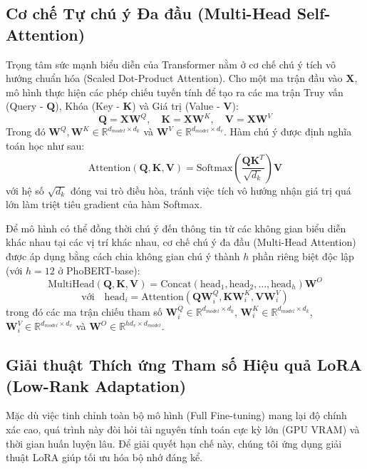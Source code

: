 \subsection{Cơ chế Tự chú ý Đa đầu (Multi-Head Self-Attention)}
Trọng tâm sức mạnh biểu diễn của Transformer nằm ở cơ chế chú ý tích vô hướng chuẩn hóa (Scaled Dot-Product Attention). Cho một ma trận đầu vào $\mathbf{X}$, mô hình thực hiện các phép chiếu tuyến tính để tạo ra các ma trận Truy vấn (Query - $\mathbf{Q}$), Khóa (Key - $\mathbf{K}$) và Giá trị (Value - $\mathbf{V}$):
\begin{equation}
    \mathbf{Q} = \mathbf{X}\mathbf{W}^Q, \quad \mathbf{K} = \mathbf{X}\mathbf{W}^K, \quad \mathbf{V} = \mathbf{X}\mathbf{W}^V
\end{equation}
Trong đó $\mathbf{W}^Q, \mathbf{W}^K \in \mathbb{R}^{d_{model} \times d_k}$ và $\mathbf{W}^V \in \mathbb{R}^{d_{model} \times d_v}$. Hàm chú ý được định nghĩa toán học như sau:
\begin{equation}
    \text{Attention}(\mathbf{Q}, \mathbf{K}, \mathbf{V}) = \text{Softmax}\left(\frac{\mathbf{Q}\mathbf{K}^T}{\sqrt{d_k}}\right)\mathbf{V}
\end{equation}
với hệ số $\sqrt{d_k}$ đóng vai trò điều hòa, tránh việc tích vô hướng nhận giá trị quá lớn làm triệt tiêu gradient của hàm Softmax.

Để mô hình có thể đồng thời chú ý đến thông tin từ các không gian biểu diễn khác nhau tại các vị trí khác nhau, cơ chế chú ý đa đầu (Multi-Head Attention) được áp dụng bằng cách chia không gian chú ý thành $h$ phần riêng biệt độc lập (với $h = 12$ ở PhoBERT-base):
\begin{equation}
    \text{MultiHead}(\mathbf{Q}, \mathbf{K}, \mathbf{V}) = \text{Concat}(\text{head}_1, \text{head}_2, \dots, \text{head}_h)\mathbf{W}^O
\end{equation}
\begin{equation}
    \text{với} \quad \text{head}_i = \text{Attention}(\mathbf{Q}\mathbf{W}_i^Q, \mathbf{K}\mathbf{W}_i^K, \mathbf{V}\mathbf{W}_i^V)
\end{equation}
trong đó các ma trận chiếu tham số $\mathbf{W}_i^Q \in \mathbb{R}^{d_{model} \times d_k}$, $\mathbf{W}_i^K \in \mathbb{R}^{d_{model} \times d_k}$, $\mathbf{W}_i^V \in \mathbb{R}^{d_{model} \times d_v}$ và $\mathbf{W}^O \in \mathbb{R}^{h d_v \times d_{model}}$.

\subsection{Giải thuật Thích ứng Tham số Hiệu quả LoRA (Low-Rank Adaptation)}
Mặc dù việc tinh chỉnh toàn bộ mô hình (Full Fine-tuning) mang lại độ chính xác cao, quá trình này đòi hỏi tài nguyên tính toán cực kỳ lớn (GPU VRAM) và thời gian huấn luyện lâu. Để giải quyết hạn chế này, chúng tôi ứng dụng giải thuật LoRA \cite{lora} giúp tối ưu hóa bộ nhớ đáng kể.

